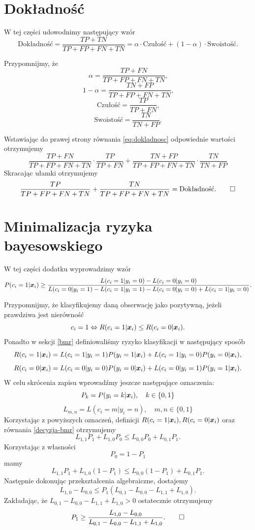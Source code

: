 \documentclass[inzynierska]{pwr_wmat_praca_dyplomowa}
\theoremstyle{plain}
\numberwithin{theorem}{chapter}
\theoremstyle{definition}
\numberwithin{theorem}{chapter}
\begin{document}

\appendix

\chapter{Dokładność}
\label{dokladnosc-dd}
W tej części udowodnimy następujący wzór
\begin{equation}
	\label{eq:dokladnosc}
	\text{Dokładność} = \frac{TP + TN}{TP + FP + FN + TN} = \alpha \cdot \text{Czułość} + (1-\alpha) \cdot \text{Swoistość} \text{.}
\end{equation}

Przypomnijmy, że
$$ \alpha = \frac{TP + FN}{TP + FP + FN + TN} \text{,} $$
$$ 1 - \alpha = \frac{TN + FP}{TP + FP + FN + TN} \text{,} $$
$$ \text{Czułość} = \frac{TP}{TP + FN} \text{,} $$
$$ \text{Swoistość} = \frac{TN}{TN + FP} \text{.} $$

Wstawiając do prawej strony równania \ref{eq:dokladnosc} odpowiednie wartości otrzymujemy
$$\frac{TP + FN}{TP + FP + FN + TN} \cdot \frac{TP}{TP + FN} + \frac{TN + FP}{TP + FP + FN + TN} \cdot \frac{TN}{TN + FP} $$
Skracając  ułamki otrzymujemy
$$ \frac{TP}{TP + FP + FN + TN} + \frac{TN}{TP + FP + FN + TN} = \text{Dokładność} \text{.} \qed $$


\chapter{Minimalizacja ryzyka bayesowskiego}
\label{bmr-proof}
W tej części dodatku wyprowadzimy wzór 
$$ P(c_i = 1|\boldsymbol{x}_{i}) \ge \frac{L(c_i = 1|y_i = 0) - L(c_i = 0|y_i = 0)}{L(c_i = 0|y_i = 1) - L(c_i = 1|y_i = 1) - L(c_i = 0|y_i = 0) + L(c_i = 1|y_i = 0)} \text{.}$$

Przypomnijmy, że klasyfikujemy daną obserwację jako pozytywną, jeżeli prawdziwa jest  nierówność
\begin{equation}
	\label{decyzja-bmr}
	c_i = 1 \Leftrightarrow R(c_i = 1|\boldsymbol{x}_{i}) \leq R(c_i = 0|\boldsymbol{x}_{i}) \text{.}
\end{equation}
Ponadto w sekcji \ref{bmr} definiowaliśmy ryzyko klasyfikacji w następujący sposób
$$ R(c_i = 1|\boldsymbol{x}_{i}) = L(c_i = 1|y_i = 1)P(y_i = 1|\boldsymbol{x}_{i}) + L(c_i = 1|y_i = 0)P(y_i = 0|\boldsymbol{x}_{i}) \text{,}$$
$$ R(c_i = 0|\boldsymbol{x}_{i}) = L(c_i = 0|y_i = 0)P(y_i = 0|\boldsymbol{x}_{i}) + L(c_i = 0|y_i = 1)P(y_i = 1|\boldsymbol{x}_{i}) \text{.}$$
W celu skrócenia zapisu wprowadźmy jeszcze następujące oznaczenia:
$$ P_k = P(y_i = k|\boldsymbol{x}_{i}), \quad k \in \{0,1\} $$
$$ L_{m,n} = L(c_i = m|y_i = n), \quad m,n \in \{0,1\}$$
Korzystając z powyższych oznaczeń, definicji $R(c_i = 1|\boldsymbol{x}_{i}), R(c_i = 0|\boldsymbol{x}_{i})$ oraz równania \ref{decyzja-bmr} otrzymujemy
$$ L_{1,1}P_1 + L_{1,0}P_0 \leq L_{0,0}P_0 + L_{0,1}P_1 \text{.}$$
Korzystając z własności 
$$ P_0 = 1 - P_1 $$
mamy
$$ L_{1,1}P_1 + L_{1,0}(1-P_1) \leq L_{0,0}(1-P_1) + L_{0,1}P_1 \text{.}$$
Następnie dokonując przekształcenia algebraiczne, dostajemy
$$ L_{1,0}-L_{0,0} \leq P_1 (L_{0,1} - L_{0,0} - L_{1,1} + L_{1,0}) \text{.} $$
Zakładając, że $L_{0,1} - L_{0,0} - L_{1,1} + L_{1,0} > 0$ ostatecznie otrzymujemy
$$ P_1 \geq \frac{L_{1,0}-L_{0,0}}{L_{0,1} - L_{0,0} - L_{1,1} + L_{1,0}}. \qed $$
\backmatter
\nocite{*}

\end{document}
